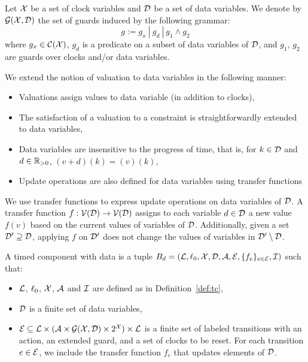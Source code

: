 \begin{definition}\label{def:guard}
  Let $\mathcal{X}$ be a set of clock variables and $\mathcal{D}$ be a set of
  data variables. We denote by $\mathcal{G(X,D)}$ the set of guards induced
  by the following grammar:
  \begin{displaymath}
    g:=g_x \ | \ g_d \ | \ g_1\wedge g_2
  \end{displaymath}
  where $g_x\in\mathcal{C(X)}$, $g_d$ is a predicate on a subset of data variables
  of $\mathcal{D}$, and $g_1$, $g_2$ are guards over clocks and/or data variables.
\end{definition}

We extend the notion of valuation to data variables in the following manner:
\begin{itemize}
  \item Valuations assign values to data variable (in addition to clocks),
  \item The satisfaction of a valuation to a constraint is straightforwardly 
    extended to data variables,
  \item Data variables are insensitive to the progress of time, that is, for $k\in\mathcal{D}$ and
    $d\in\mathbb{R}_{> 0}$, $(v+d)(k)=(v)(k)$,
  \item Update operations are also defined for data variables using transfer functions

\end{itemize}

We use transfer functions to express update operations on data variables of $\mathcal{D}$. A transfer 
function $f:\mathcal{V}(\mathcal{D})\to\mathcal{V}(\mathcal{D})$ assigns to each variable $d\in\mathcal{D}$ a new value $f(v)$ based on the
current values of variables of $\mathcal{D}$. Additionally, given a set $\mathcal{D}'\supseteq\mathcal{D}$, applying $f$
on $\mathcal{D}'$ does not change the values of variables in $\mathcal{D}'\setminus\mathcal{D}$.

\begin{definition}\label{def:tce}
  A timed component with data is a tuple 
  $B_d=(\mathcal{L},\ell_0,\mathcal{X},\mathcal{D},\mathcal{A},\mathcal{E},\{f_e\}_{e\in\mathcal{E}},\mathcal{I})$ such that:
  \begin{itemize}
    \item $\mathcal{L}$, $\ell_0$, $\mathcal{X}$, $\mathcal{A}$ and $\mathcal{I}$ are defined as
      in Definition~\ref{def:tc},
    \item $\mathcal{D}$ is a finite set of data variables,
    \item $\mathcal{E}\subseteq\mathcal{L}\times(\mathcal{A}\times\mathcal{G(X,D)}\times2^{\mathcal{X}})\times\mathcal{L}$
    is a finite set of labeled transitions with an action, an extended guard, 
      and a set of clocks to be reset. For each transition $e\in\mathcal{E}$, we include the transfer
      function $f_e$ that updates elements of $\mathcal{D}$. 
  \end{itemize}
\end{definition}


